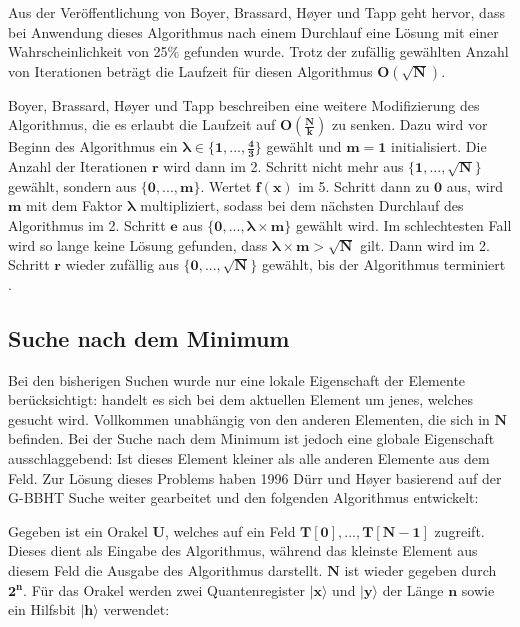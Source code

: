Aus der Veröffentlichung von Boyer, Brassard, Høyer und Tapp geht hervor, dass bei Anwendung dieses Algorithmus nach einem Durchlauf eine Lösung mit einer Wahrscheinlichkeit von 25\% gefunden wurde. 
Trotz der zufällig gewählten Anzahl von Iterationen beträgt die Laufzeit für diesen Algorithmus $\mathbf{O(\sqrt{N})}$.

Boyer, Brassard, Høyer und Tapp beschreiben eine weitere Modifizierung des Algorithmus, die es erlaubt die Laufzeit auf $\mathbf{O(\frac{N}{k})}$ zu senken. 
Dazu wird vor Beginn des Algorithmus ein $\mathbf{\pmb\lambda \in \{1, ..., \frac{4}{3} \} }$ gewählt und $\mathbf{m = 1}$ initialisiert. Die Anzahl der Iterationen $\mathbf{r}$ wird dann im 2. Schritt nicht mehr aus $\mathbf{\{1, ..., \sqrt{N}\}}$ gewählt, sondern aus $\mathbf{\{0, ..., m\}}$. 
Wertet $\mathbf{f(x)}$ im 5. Schritt dann zu $\mathbf{0}$ aus, wird $\mathbf{m}$ mit dem Faktor $\mathbf{\pmb\lambda}$ multipliziert, sodass bei dem nächsten Durchlauf des Algorithmus im 2. Schritt $\mathbf{e}$ aus $\mathbf{\{0, ..., \pmb\lambda \times m\}}$  gewählt wird. 
Im schlechtesten Fall wird so lange keine Lösung gefunden, dass $\mathbf{\pmb\lambda \times m > \sqrt{N}}$ gilt. Dann wird im 2. Schritt $\mathbf{r}$ wieder zufällig aus $\mathbf{\{0, ..., \sqrt{N}\}}$ gewählt, bis der Algorithmus terminiert \cite[S. 141]{Ho99}.


\subsection{Suche nach dem Minimum} \label{minimum}
Bei den bisherigen Suchen wurde nur eine lokale Eigenschaft der Elemente berücksichtigt: handelt es sich bei dem aktuellen Element um jenes, welches gesucht wird. 
Vollkommen unabhängig von den anderen Elementen, die sich in $\mathbf{N}$ befinden. Bei der Suche nach dem Minimum ist jedoch eine globale Eigenschaft ausschlaggebend: Ist dieses Element kleiner als alle anderen Elemente aus dem Feld.
Zur Lösung dieses Problems haben 1996 Dürr und Høyer basierend auf der G-BBHT Suche weiter gearbeitet und den folgenden Algorithmus entwickelt: 

Gegeben ist ein Orakel $\mathbf{U}$, welches auf ein Feld $\mathbf{T[0], ..., T[N-1]}$ zugreift. 
Dieses dient als Eingabe des Algorithmus, während das kleinste Element aus diesem Feld die Ausgabe des Algorithmus darstellt. $\mathbf{N}$ ist wieder gegeben durch $\mathbf{2^n}$. 
Für das Orakel werden zwei Quantenregister $\mathbf{|x\rangle}$ und $\mathbf{|y\rangle}$ der Länge $\mathbf{n}$ sowie ein Hilfsbit $\mathbf{|h\rangle}$ verwendet:

